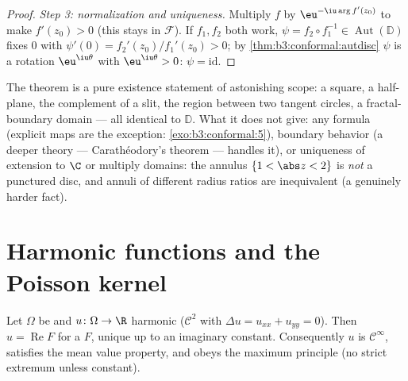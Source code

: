 \begin{proof}
\emph{Step 3: normalization and uniqueness.} Multiply $f$ by
$\eu^{-\iu\arg f'(z_0)}$ to make $f'(z_0) > 0$ (this stays in
$\mathcal F$). If $f_1, f_2$ both work, $\psi =
f_2\circ f_1^{-1} \in \operatorname{Aut}(\mathbb D)$ fixes
$0$ with $\psi'(0) = f_2'(z_0)/f_1'(z_0) > 0$; by
\cref{thm:b3:conformal:autdisc} $\psi$ is a rotation
$\eu^{\iu\theta}$ with $\eu^{\iu\theta} > 0$: $\psi =
\mathrm{id}$.
\end{proof}

\begin{remark}\label{rem:b3:conformal:rmtscope}
The theorem is a pure existence statement of astonishing
scope: a square, a half-plane, the complement of a slit, the
region between two tangent circles, a fractal-boundary domain
--- all  identical to $\mathbb D$. What it does not
give: any formula (explicit maps are the exception:
\cref{exo:b3:conformal:5}), boundary behavior (a deeper theory
--- Carath\'eodory's theorem --- handles it), or uniqueness
of extension to $\C$ or multiply  domains: the
annulus $\{1 < \abs z < 2\}$ is \emph{not}  a
punctured disc, and annuli of different radius ratios are
inequivalent (a genuinely harder fact).
\end{remark}

\section{Harmonic functions and the Poisson kernel}

\begin{proposition}\label{prop:b3:conformal:harmonicholo}
Let $\Omega$ be  and $u \colon \Omega \to \R$
harmonic ($\mathcal C^2$ with
$\Delta u = u_{xx} + u_{yy} = 0$). Then $u =
\operatorname{Re}F$ for a  $F$, unique up to an
imaginary constant. Consequently $u$ is $\mathcal C^\infty$,
satisfies the mean value property, and obeys the maximum
principle (no strict  extremum unless constant).
\end{proposition}

